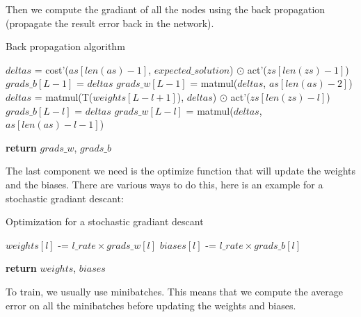 \documentclass[a4paper]{article}
\begin{document}
Then we compute the gradiant of all the nodes using the back propagation
(propagate the result error back in the network).

\begin{algorithm}
  \caption{Back propagation algorithm}
  \begin{algorithmic}
      \State $deltas$ = cost'($as[len(as) - 1]$, $expected\_solution$) $\odot$ act'($zs[len(zs) - 1]$)
      \State $grads\_b[L - 1]$ = $deltas$
      \State $grads\_w[L - 1]$ = matmul($deltas$, $as[len(as) - 2]$) \\

        \State $deltas$ = matmul(T($weights[L - l + 1]$), $deltas$) $\odot$ act'($zs[len(zs) - l]$)
        \State $grads\_b[L - l]$ = $deltas$
        \State $grads\_w[L - l]$ = matmul($deltas$, $as[len(as) - l - 1]$)
      \EndFor

      \State \textbf{return} $grads\_w$, $grads\_b$
    \EndProcedure
  \end{algorithmic}
\end{algorithm}

The last component we need is the optimize function that will update the weights
and the biases. There are various ways to do this, here is an example for a
stochastic gradiant descant:

\begin{algorithm}
  \caption{Optimization for a stochastic gradiant descant}
  \begin{algorithmic}
        \State $weights[l]$ -= $l\_rate \times grads\_w[l]$
        \State $biases[l]$ -= $l\_rate \times grads\_b[l]$
      \EndFor

      \State \textbf{return} $weights$, $biases$
    \EndProcedure
  \end{algorithmic}
\end{algorithm}

To train, we usually use minibatches. This means that we compute the average
error on all the minibatches before updating the weights and biases.
\end{document}
